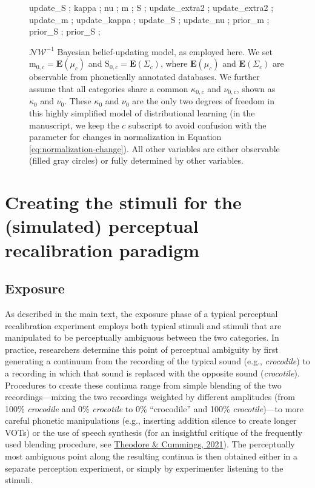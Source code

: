\documentclass[
  11pt,
  english,
  man,floatsintext]{apa6}
\begin{document}
\begin{figure}
{     {update_S} ; %
     {kappa} ; %
     {nu} ; %
     {m} ; %
     {S} ; %
     {update_extra2} ; %
     {update_extra2} ; %
     {update_m} ; %
     {update_kappa} ; %
     {update_S} ; %
     {update_nu} ; %
     {prior_m} ;
     {prior_S} ;
     {prior_S} ;
  }
  \caption{$\mathcal{NW}^{-1}$ Bayesian belief-updating model, as employed here. We set $\mathrm{m}_{0,c} = \mathbf{E}(\mu_c)$ and $\mathrm{S}_{0,c}=\mathbf{E}(\Sigma_c)$, where $\mathbf{E}(\mu_c)$ and $\mathbf{E}(\Sigma_c)$ are observable from phonetically annotated databases. We further assume that all categories share a common $\kappa_{0,c}$ and $\nu_{0,c}$, shown as $\kappa_{0}$ and $\nu_{0}$. These $\kappa_{0}$ and $\nu_{0}$ are the only two degrees of freedom in this highly simplified model of distributional learning (in the manuscript, we keep the $c$ subscript to avoid confusion with the parameter for changes in normalization in Equation \ref{eq:normalization-change}). All other variables are either observable (filled gray circles) or fully determined by other variables.}\label{fig:model-belief-updating}
\end{figure}

\hypertarget{sec:SI-PR}{%
\section{Creating the stimuli for the (simulated) perceptual recalibration paradigm}\label{sec:SI-PR}}

\hypertarget{exposure}{%
\subsection{Exposure}\label{exposure}}

As described in the main text, the exposure phase of a typical perceptual recalibration experiment employs both typical stimuli and stimuli that are manipulated to be perceptually ambiguous between the two categories. In practice, researchers determine this point of perceptual ambiguity by first generating a continuum from the recording of the typical sound (e.g., \emph{crocodile}) to a recording in which that sound is replaced with the opposite sound (\emph{crocotile}). Procedures to create these continua range from simple blending of the two recordings---mixing the two recordings weighted by different amplitudes (from 100\% \emph{crocodile} and 0\% \emph{crocotile} to 0\% ``crocodile'' and 100\% \emph{crocotile})---to more careful phonetic manipulations (e.g., inserting addition silence to create longer VOTs) or the use of speech synthesis (for an insightful critique of the frequently used blending procedure, see \protect\hyperlink{ref-theodore-cummings2021}{Theodore \& Cummings, 2021}). The perceptually most ambiguous point along the resulting continua is then obtained either in a separate perception experiment, or simply by experimenter listening to the stimuli.
\end{document}
